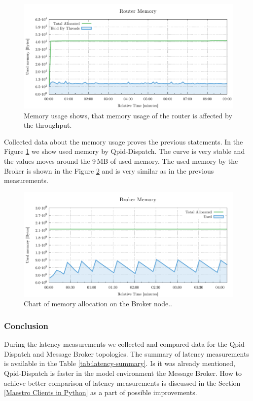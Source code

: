 \begin{figure}[H]
	\centering
	\includegraphics[width=1\linewidth]{obrazky-figures/charts/multipoint-router-only-latency-memory.pdf}
	\caption{Memory usage shows, that memory usage of the router is affected by the throughput.}
	\label{fig:latency-multiple-router-memory}
\end{figure}

Collected data about the memory usage proves the previous statements. In the Figure \ref{fig:latency-multiple-router-memory} we show used memory by Qpid-Dispatch. The curve is very stable and the values moves around the 9\,MB of used memory. The used memory by the Broker is shown in the Figure \ref{fig:latency-multiple-broker-memory} and is very similar as in the previous measurements.

\begin{figure}[H]
	\centering
	\includegraphics[width=1\linewidth]{obrazky-figures/charts/multipoint-router-broker-latency-memory.pdf}
	\caption{Chart of memory allocation on the Broker node..}
	\label{fig:latency-multiple-broker-memory}
\end{figure}

\subsubsection*{Conclusion}
During the latency measurements we collected and compared data for the Qpid-Dispatch and Message Broker topologies. The summary of latency measurements is available in the Table \ref{tab:latency-summary}. Is it was already mentioned, Qpid-Dispatch is faster in the model environment the Message Broker. How to achieve better comparison of latency measurements is discussed in the Section \ref{Maestro Clients in Python} as a part of possible improvements.

